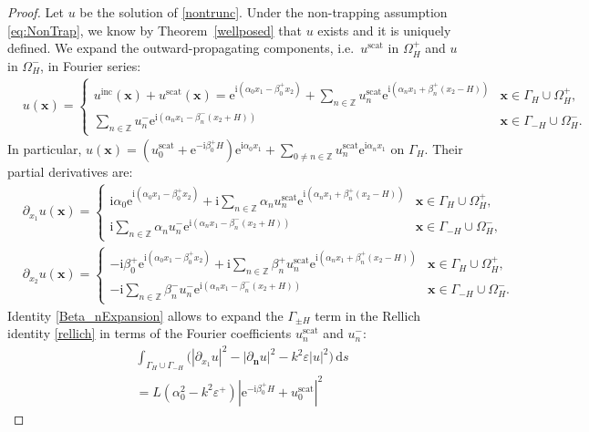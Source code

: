 \documentclass[10pt,a4paper]{amsart}
\newcommand{\IZ}{{\mathbb Z}}
\newcommand{\bx}{{\mathbf x}}
\newcommand{\bn}{{\mathbf n}}
\newcommand{\ri}{{\mathrm i}}
\newcommand{\re}{{\mathrm e}}
\newcommand{\rd}{{\,\mathrm d}}
\newcommand{\inc}{{\mathrm{inc}}}
\newcommand{\scat}{{\mathrm{scat}}}
\newcommand{\dn}{{\partial_\bn}}
\newcommand{\dxo}{{\partial_{x_1}}}
\newcommand{\dxt}{{\partial_{x_2}}}
\newcommand{\GH}{{\Gamma_H}}
\newcommand{\GmH}{{\Gamma_{-H}}}
\newcommand{\GpmH}{{\Gamma_{\pm H}}}
\begin{document}
\begin{proof}
Let $u$ be the solution of \eqref{nontrunc}.
Under the non-trapping assumption \eqref{eq:NonTrap}, we know by Theorem~\ref{wellposed} that $u$ exists and it is uniquely defined.
We expand the outward-propagating components, 
i.e.\ $u^\scat$ in $\Omega_H^+$ and $u$ in $\Omega_H^-$, in Fourier series:
\begin{align*}
	&u(\bx)=
	\begin{cases}\displaystyle
		u^\inc(\bx)+u^\scat(\bx)
		=\re^{\ri(\alpha_0x_1-\beta_0^+x_2)}+
		\sum_{n \in \IZ}u_n^\scat\re^{\ri(\alpha_nx_1+\beta_n^+ (x_2-H))} & \bx\in\GH\cup \Omega_H^+,
		\\\displaystyle
		\sum_{n \in \IZ}u_n^-\re^{\ri(\alpha_nx_1-\beta_n^- (x_2+H))} & \bx\in\GmH\cup \Omega_H^-.
	\end{cases}
\end{align*}
In particular,
$u(\bx)=(u_0^\scat+\re^{-\ri\beta_0^+H})\re^{\ri\alpha_0x_1}
+\sum_{0\ne n \in \IZ}u_n^\scat\re^{\ri\alpha_nx_1}$ on $\GH$.
Their partial derivatives are:
\begin{align*}
	&\dxo u(\bx)=
	\begin{cases}\displaystyle
		\ri\alpha_0\re^{\ri(\alpha_0x_1-\beta_0^+x_2)}+
		\ri\sum_{n \in \IZ}\alpha_n u_n^\scat\re^{\ri(\alpha_nx_1+\beta_n^+ (x_2-H))} & \bx\in\GH\cup \Omega_H^+,
		\\\displaystyle
		\ri\sum_{n \in \IZ}\alpha_n u_n^-\re^{\ri(\alpha_nx_1-\beta_n^- (x_2+H))} & \bx\in\GmH\cup \Omega_H^-,
	\end{cases}
	\\
	&\dxt u(\bx)=
	\begin{cases}\displaystyle
		-\ri\beta_0^+\re^{\ri(\alpha_0x_1-\beta_0^+x_2)}+
		\ri\sum_{n \in \IZ}\beta_n^+ u_n^\scat\re^{\ri(\alpha_nx_1+\beta_n^+ (x_2-H))} & \bx\in\GH\cup \Omega_H^+,
		\\\displaystyle
		-\ri\sum_{n \in \IZ}\beta_n^- u_n^-\re^{\ri(\alpha_nx_1-\beta_n^- (x_2+H))} & \bx\in\GmH\cup \Omega_H^-.
	\end{cases}%
\end{align*}
Identity \eqref{Beta_nExpansion} allows to expand the $\GpmH$ term in the Rellich identity \eqref{rellich} in terms of the Fourier coefficients $u_n^\scat$ and $u_n^-$:
\begin{align*}
	&\int_{\GH\cup \GmH} \biggl(\left| \dxo u \right|^2 - \left| \dn u \right|^2 -k^2\varepsilon |u|^2 \biggr) \rd s \\
	&= L(\alpha_0^2-k^2\varepsilon^+)|\re^{-\ri \beta_0^+H}+u_0^\scat|^2

\end{align*}
\end{proof}
\end{document}
